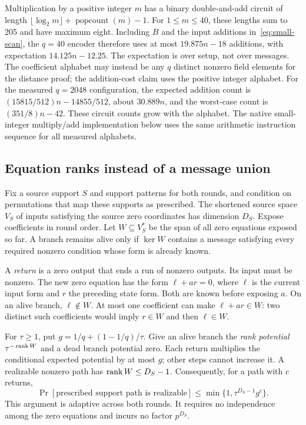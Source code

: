 Multiplication by a positive integer $m$ has a binary double-and-add
circuit of length $\lfloor\log_2 m\rfloor+\operatorname{popcount}(m)-1$.
For $1\le m\le40$, these lengths sum to 205 and have maximum eight. Including $B$ and the
input additions in~\eqref{eq:small-scan}, the $q=40$ encoder therefore
uses at most $19.875n-18$ additions, with expectation $14.125n-12.25$.
The expectation is over setup, not over messages. The coefficient alphabet
may instead be any $q$ distinct nonzero field elements for the distance
proof; the addition-cost claim uses the positive integer alphabet.
For the measured $q=2048$ configuration, the expected addition
count is $(15815/512)n-14855/512$, about $30.889n$, and the worst-case
count is $(351/8)n-42$. These circuit counts grow with the alphabet.
The native small-integer multiply/add implementation below uses the same
arithmetic instruction sequence for all measured alphabets.

\subsection{Equation ranks instead of a message union}

Fix a source support $S$ and support patterns for both rounds, and condition
on permutations that map these supports as prescribed. The shortened
source space $V_S$ of inputs satisfying the source zero coordinates has
dimension $D_S$. Expose coefficients in round order. Let
$W\subseteq V_S^*$ be the span of all zero equations exposed so far.
A branch remains alive only if $\ker W$ contains a message satisfying
every required nonzero condition whose form is already known.

A \emph{return} is a zero output that ends a run of nonzero outputs.
Its input must be nonzero. The new zero equation has the form
$\ell+a r=0$, where $\ell$ is the current input form and $r$ the
preceding state form. Both are known before exposing $a$. On an alive
branch, $\ell\notin W$. At most one coefficient can make
$\ell+a r\in W$: two distinct such coefficients would imply
$r\in W$ and then $\ell\in W$.

For $\tau\ge1$, put $g=1/q+(1-1/q)/\tau$. Give an alive branch the
\emph{rank potential} $\tau^{-\operatorname{rank} W}$ and a dead branch potential
zero. Each return multiplies the conditional expected potential by at
most $g$; other steps cannot increase it. A realizable nonzero path
has $\operatorname{rank} W\le D_S-1$. Consequently, for a path with $c$ returns,
\begin{equation}\label{eq:small-rank}
 \Pr[\text{prescribed support path is realizable}]
 \le \min\{1,\tau^{D_S-1}g^c\}.
\end{equation}
This argument is adaptive across both rounds. It requires no independence
among the zero equations and incurs no factor $p^{D_S}$.

